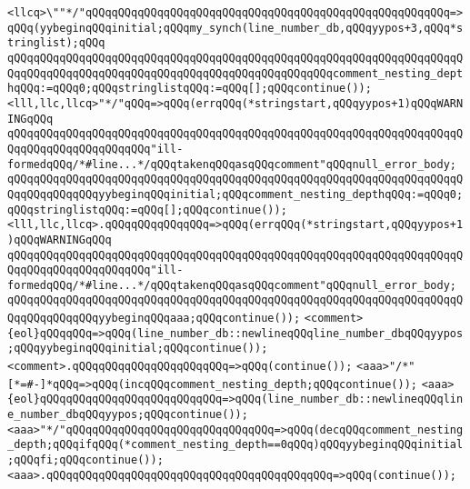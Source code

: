 \verb|<llcq>\""*/"qQQqqQQqqQQqqQQqqQQqqQQqqQQqqQQqqQQqqQQqqQQqqQQqqQQqqQQq=>qQQq(yybeginqQQqinitial;qQQqmy_synch(line_number_db,qQQqyypos+3,qQQq*stringlist);qQQq|\newline
\verb|qQQqqQQqqQQqqQQqqQQqqQQqqQQqqQQqqQQqqQQqqQQqqQQqqQQqqQQqqQQqqQQqqQQqqQQqqQQqqQQqqQQqqQQqqQQqqQQqqQQqqQQqqQQqqQQqqQQqqQQqcomment_nesting_depthqQQq:=qQQq0;qQQqstringlistqQQq:=qQQq[];qQQqcontinue());|\newline
\verb|<lll,llc,llcq>"*/"qQQq=>qQQq(errqQQq(*stringstart,qQQqyypos+1)qQQqWARNINGqQQq|\newline
\verb|qQQqqQQqqQQqqQQqqQQqqQQqqQQqqQQqqQQqqQQqqQQqqQQqqQQqqQQqqQQqqQQqqQQqqQQqqQQqqQQqqQQqqQQqqQQq"ill-formedqQQq/*#line...*/qQQqtakenqQQqasqQQqcomment"qQQqnull_error_body;|\newline
\verb|qQQqqQQqqQQqqQQqqQQqqQQqqQQqqQQqqQQqqQQqqQQqqQQqqQQqqQQqqQQqqQQqqQQqqQQqqQQqqQQqqQQqyybeginqQQqinitial;qQQqcomment_nesting_depthqQQq:=qQQq0;qQQqstringlistqQQq:=qQQq[];qQQqcontinue());|\newline
\verb|<lll,llc,llcq>.qQQqqQQqqQQqqQQq=>qQQq(errqQQq(*stringstart,qQQqyypos+1)qQQqWARNINGqQQq|\newline
\verb|qQQqqQQqqQQqqQQqqQQqqQQqqQQqqQQqqQQqqQQqqQQqqQQqqQQqqQQqqQQqqQQqqQQqqQQqqQQqqQQqqQQqqQQqqQQq"ill-formedqQQq/*#line...*/qQQqtakenqQQqasqQQqcomment"qQQqnull_error_body;|\newline
\verb|qQQqqQQqqQQqqQQqqQQqqQQqqQQqqQQqqQQqqQQqqQQqqQQqqQQqqQQqqQQqqQQqqQQqqQQqqQQqqQQqqQQqyybeginqQQqaaa;qQQqcontinue());|\newline
\newline
\verb|<comment>{eol}qQQqqQQq=>qQQq(line_number_db::newlineqQQqline_number_dbqQQqyypos;qQQqyybeginqQQqinitial;qQQqcontinue());|\newline
\verb|<comment>.qQQqqQQqqQQqqQQqqQQqqQQq=>qQQq(continue());|\newline
\newline
\newline
\verb|<aaa>"/*"[*=#-]*qQQq=>qQQq(incqQQqcomment_nesting_depth;qQQqcontinue());|\newline
\verb|<aaa>{eol}qQQqqQQqqQQqqQQqqQQqqQQqqQQq=>qQQq(line_number_db::newlineqQQqline_number_dbqQQqyypos;qQQqcontinue());|\newline
\verb|<aaa>"*/"qQQqqQQqqQQqqQQqqQQqqQQqqQQqqQQq=>qQQq(decqQQqcomment_nesting_depth;qQQqifqQQq(*comment_nesting_depth==0qQQq)qQQqyybeginqQQqinitial;qQQqfi;qQQqcontinue());|\newline
\verb|<aaa>.qQQqqQQqqQQqqQQqqQQqqQQqqQQqqQQqqQQqqQQqqQQq=>qQQq(continue());|\newline
